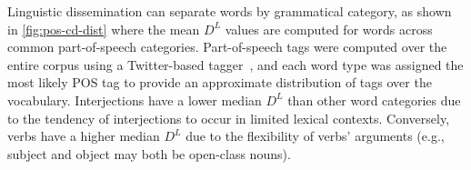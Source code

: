 Linguistic dissemination can separate words by grammatical category, as shown in \autoref{fig:pos-cd-dist} where the mean $D^{L}$ values are computed for words across common part-of-speech categories.
Part-of-speech tags were computed over the entire corpus using a Twitter-based tagger~\cite{gimpel2011}, and each word type was assigned the most likely POS tag to provide an approximate distribution of tags over the vocabulary.
Interjections have a lower median $D^{L}$ than other word categories due to the tendency of interjections to occur in limited lexical contexts.
Conversely, verbs have  a higher median $D^{L}$ due to the flexibility of verbs' arguments (e.g., subject and object may both be open-class nouns).


